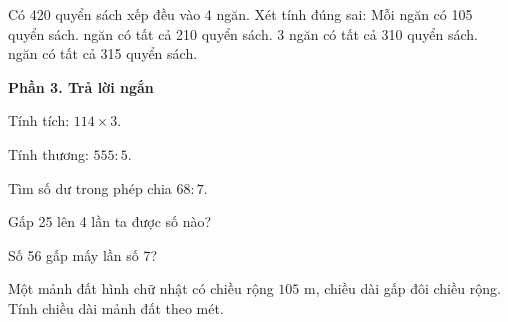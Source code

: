 \begin{ex} %
Có 420 quyển sách xếp đều vào 4 ngăn. Xét tính đúng sai:
\choiceTF
{\True Mỗi ngăn có 105 quyển sách.}
{ ngăn có tất cả 210 quyển sách.}
{3 ngăn có tất cả 310 quyển sách.}
{ ngăn có tất cả 315 quyển sách.}
\end{ex}

\textbf{Phần 3. Trả lời ngắn}

\begin{ex} %
Tính tích: $114 \times 3$.
\end{ex}

\begin{ex} %
Tính thương: $555 : 5$.
\end{ex}

\begin{ex} %
Tìm số dư trong phép chia $68 : 7$.
\end{ex}

\begin{ex} %
Gấp 25 lên 4 lần ta được số nào?
\end{ex}

\begin{ex} %
Số 56 gấp mấy lần số 7?
\end{ex}

\begin{ex} %
Một mảnh đất hình chữ nhật có chiều rộng $105\text{ m}$, chiều dài gấp đôi chiều rộng. Tính chiều dài mảnh đất theo mét.
\end{ex}
